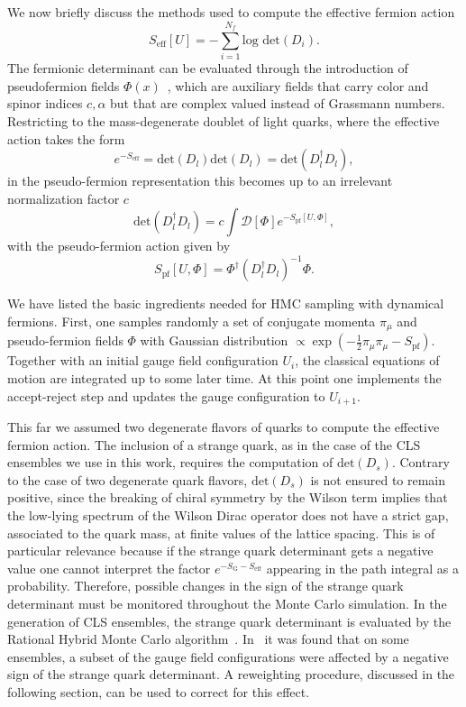 We now briefly discuss the methods used to compute the effective fermion action
\begin{equation}
S_{\textrm{eff}}[U]=-\sum_{i=1}^{N_f}\textrm{log det}(D_i).
\end{equation}
The fermionic determinant can be evaluated through the introduction of pseudofermion fields $\Phi(x)$~\citep{Weingarten:1980hx}, which are auxiliary fields that carry color and spinor indices $c,\alpha$ but that are complex valued instead of Grassmann numbers. Restricting to the mass-degenerate doublet of light quarks, where the effective action takes the form
\begin{equation}
e^{-S_{\textrm{eff}}}=\textrm{det}(D_l)\textrm{det}(D_l)=\textrm{det}(D_l^{\dagger}D_l),
\end{equation}
in the pseudo-fermion representation this becomes up to an irrelevant normalization factor $c$
\begin{equation}
\textrm{det}(D_l^{\dagger}D_l)=c\int\mathcal{D}[\Phi]e^{-S_{\textrm{pf}}[U,\Phi]},
\end{equation}
with the pseudo-fermion action given by
\begin{equation}
S_{\textrm{pf}}[U,\Phi]=\Phi^{\dagger}\left(D_l^{\dagger}D_l\right)^{-1}\Phi.
\end{equation}

We have listed the basic ingredients needed for HMC sampling with dynamical fermions. First, one samples randomly a set of conjugate momenta $\pi_{\mu}$ and pseudo-fermion fields $\Phi$ with Gaussian distribution $\propto\exp\left(-\frac{1}{2}\pi_{\mu}\pi_{\mu}-S_{\textrm{pf}}\right)$. Together with an initial gauge field configuration $U_{i}$, the classical equations of motion are integrated up to some later time. At this point one implements the accept-reject step and updates the gauge configuration to $U_{i+1}$.

This far we assumed two degenerate flavors of quarks to compute the effective fermion action. The inclusion of a strange quark, as in
the case of the CLS ensembles we use in this work,  requires the computation of $\textrm{det}(D_s)$. Contrary to the case of two degenerate quark flavors, $\textrm{det}(D_s)$ is not ensured to remain positive, since the breaking of chiral symmetry by the Wilson term implies that the low-lying spectrum of the Wilson Dirac operator does not have a strict gap, associated to the quark mass, at finite values of the lattice spacing. This is of particular relevance because if the strange quark determinant gets a negative value one cannot interpret the factor $e^{-S_{\textrm{G}}-S_{\textrm{eff}}}$ appearing in the path integral as a probability. Therefore, possible changes in the sign of the strange quark determinant must be monitored throughout the Monte Carlo simulation. In the generation of CLS ensembles, the strange quark determinant is evaluated by the Rational Hybrid Monte Carlo algorithm~\citep{Kennedy:1998cu,Clark:2006fx}. In~\citep{Mohler:2020txx} it was found that on some ensembles, a subset of the gauge field configurations  were affected by a negative sign of the strange quark determinant. A reweighting procedure, discussed in the following section, can be used to correct for this effect.

